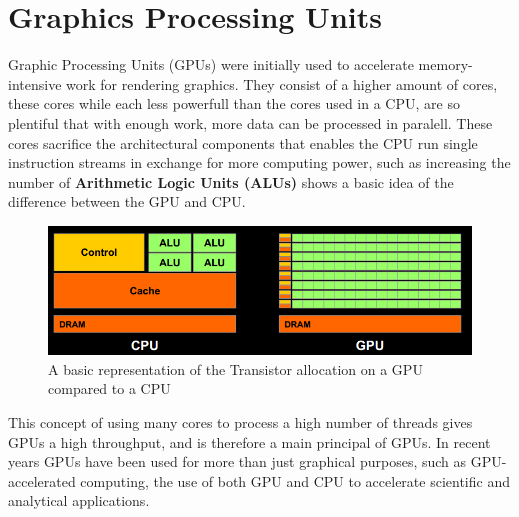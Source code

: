 \section{Graphics Processing Units}
Graphic Processing Units (GPUs) were initially used to accelerate memory-intensive work for rendering graphics.
They consist of a higher amount of cores, these cores while each less powerfull than the cores used in a CPU, are so plentiful that with enough work, more data can be processed in paralell.
These cores sacrifice the architectural components that enables the CPU run single instruction streams in exchange for more computing power, such as increasing the number of \textbf{Arithmetic Logic Units (ALUs)}  shows a basic idea of the difference between the GPU and CPU. %
\begin{figure}[h!]
\centering
 \includegraphics[width=1\textwidth]{figures/GPUCPUimage.png} %
\caption{A basic representation of the Transistor allocation on a GPU compared to a CPU}\label{image:GPUCPUimage} %
\vspace{-25pt}
\end{figure}

This concept of using many cores to process a high number of threads gives GPUs a high throughput, and is therefore a main principal of GPUs.
In recent years GPUs have been used for more than just graphical purposes, such as GPU-accelerated computing, the use of both GPU and CPU to accelerate scientific and analytical applications.



